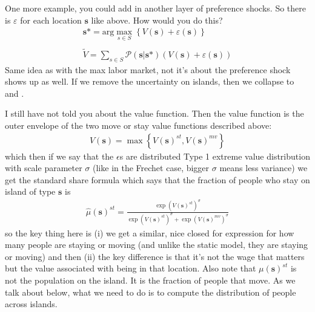 \documentclass[pdftex,12pt]{article}
\begin{document}
\medskip
\noindent One more example, you could add in another layer of preference shocks. So there is $\varepsilon$ for each location $\textbf{s}$ like above. How would you do this? 
\begin{align}
\textbf{s*} = \mbox{arg}\max_{s \in S} \left\{V(\textbf{s}) + \varepsilon(\textbf{s}) \right\}\\
\nonumber \\
\tilde V = \sum_{s \in S} \mathcal{P}(\textbf{s} | \textbf{s*}) \left( V(\textbf{s}) + \varepsilon(\textbf{s}) \right)
\end{align}
Same idea as with the max labor market, not it's about the preference shock shows up as well. If we remove the uncertainty on islands, then we collapse to \citet{caliendo2015trade} and \citet{artucc2010trade}. 



\medskip
\noindent I still have not told you about the value function. Then the value function is the outer envelope of the two move or stay value functions described above:
\begin{align}
V(\textbf{s}) = \max \left\{ V(\textbf{s})^{st}, V(\textbf{s})^{mv} \right\}
\end{align}
which then if we say that the $\epsilon$s are distributed Type 1 extreme value distribution with scale parameter $\sigma$  (like in the Frechet case, bigger $\sigma$ means less variance) we get the standard share formula which says that the fraction of people who stay on island of type $\textbf{s}$ is
\begin{align}
\hat \mu(\textbf{s})^{st} = \frac{\exp \left( V(\textbf{s})^{st} \right)^{\sigma}}{\exp \left(V(\textbf{s})^{st}\right)^{\sigma} + \exp \left(V(\textbf{s})^{mv}\right)^{\sigma}}
\label{eq:migration_shares}
\end{align}
so the key thing here is (i) we get a similar, nice closed for expression for how many people are staying or moving (and unlike the static model, they are staying or moving) and then (ii) the key difference is that it's not the wage that matters but the value associated with being in that location. Also note that $\mu(\textbf{s})^{st}$ is not the population on the island. It is the fraction of people that move. As we talk about below, what we need to do is to compute the distribution of people across islands. 
\end{document}
